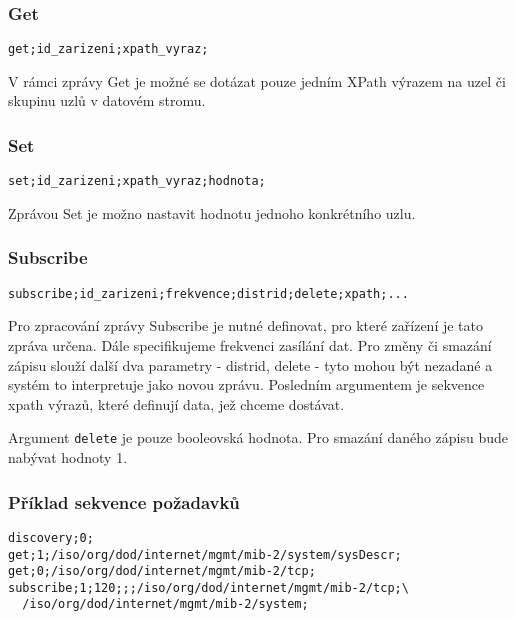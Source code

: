 \subsubsection*{Get}
\begin{verbatim}
get;id_zarizeni;xpath_vyraz;
\end{verbatim}

V rámci zprávy Get je možné se dotázat pouze jedním XPath výrazem na uzel či skupinu uzlů v datovém stromu.

\subsubsection*{Set}
\begin{verbatim}
set;id_zarizeni;xpath_vyraz;hodnota;
\end{verbatim}

Zprávou Set je možno nastavit hodnotu jednoho konkrétního uzlu.

\subsubsection*{Subscribe}
\begin{verbatim}
subscribe;id_zarizeni;frekvence;distrid;delete;xpath;...
\end{verbatim}

Pro zpracování zprávy Subscribe je nutné definovat, pro které zařízení je tato zpráva určena. Dále specifikujeme frekvenci
zasílání dat. Pro změny či smazání zápisu slouží další dva parametry - distrid, delete - tyto mohou být nezadané a systém
to interpretuje jako novou zprávu. Posledním argumentem je sekvence xpath výrazů, které definují data, jež chceme dostávat.

Argument \verb|delete| je pouze booleovská hodnota. Pro smazání daného zápisu bude nabývat hodnoty 1.

\subsubsection*{Příklad sekvence požadavků}
\begin{verbatim}
discovery;0;
get;1;/iso/org/dod/internet/mgmt/mib-2/system/sysDescr;
get;0;/iso/org/dod/internet/mgmt/mib-2/tcp;
subscribe;1;120;;;/iso/org/dod/internet/mgmt/mib-2/tcp;\
  /iso/org/dod/internet/mgmt/mib-2/system;
\end{verbatim}

